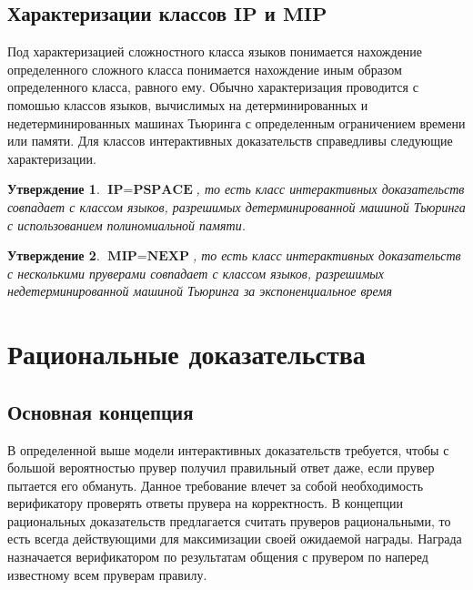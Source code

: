 \documentclass{mipt-thesis-bs}
\theoremstyle{plain}
\newtheorem{proposition}{Утверждение}
\theoremstyle{definition}
\begin{document}
\section{Характеризации классов $\textbf{IP}$ и $\textbf{MIP}$}
Под характеризацией сложностного класса языков понимается нахождение определенного сложного класса понимается нахождение иным образом определенного класса, равного ему. Обычно характеризация проводится с помошью классов языков, вычислимых на детерминированных и недетерминированных машинах Тьюринга с определенным ограничением времени или памяти. Для классов интерактивных доказательств справедливы следующие характеризации.
\begin{proposition}$\textbf{IP} = \textbf{PSPACE}$, то есть класс интерактивных доказательств совпадает с классом языков, разрешимых детерминированной машиной Тьюринга с использованием полиномиальной памяти. \cite{sha}
\end{proposition}
\begin{proposition}$\textbf{MIP} = \textbf{NEXP}$, то есть класс интерактивных доказательств с несколькими пруверами совпадает с классом языков, разрешимых недетерминированной машиной Тьюринга за экспоненциальное время \cite{babai1991mip}\end{proposition}

\chapter{Рациональные доказательства}
\section{Основная концепция}
В определенной выше модели интерактивных доказательств требуется, чтобы с большой вероятностью прувер получил правильный ответ даже, если прувер пытается его обмануть. Данное требование влечет за собой необходимость верификатору проверять ответы прувера на корректность. В концепции рациональных доказательств предлагается считать пруверов рациональными, то есть всегда действующими для максимизации своей ожидаемой награды. Награда назначается верификатором по результатам общения с прувером по наперед известному всем пруверам правилу. 
\end{document}
